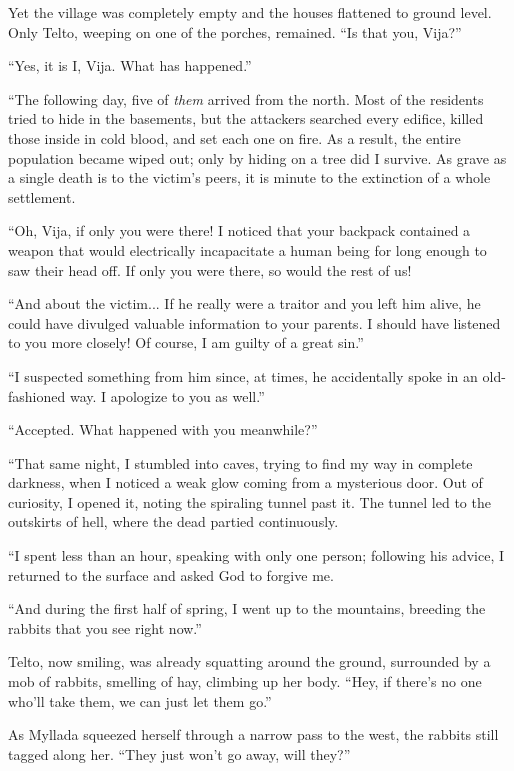 Yet the village was completely empty and the houses flattened to ground level. Only Telto, weeping on one of the porches, remained. ``Is that you, Vija?''

``Yes, it is I, Vija. What has happened.''

``The following day, five of \emph{them} arrived from the north. Most of the residents tried to hide in the basements, but the attackers searched every edifice, killed those inside in cold blood, and set each one on fire. As a result, the entire population became wiped out; only by hiding on a tree did I survive. As grave as a single death is to the victim's peers, it is minute to the extinction of a whole settlement.

``Oh, Vija, if only you were there! I noticed that your backpack contained a weapon that would electrically incapacitate a human being for long enough to saw their head off. If only you were there, so would the rest of us!

``And about the victim... If he really were a traitor and you left him alive, he could have divulged valuable information to your parents. I should have listened to you more closely! Of course, I am guilty of a great sin.''

``I suspected something from him since, at times, he accidentally spoke in an old-fashioned way. I apologize to you as well.''

``Accepted. What happened with you meanwhile?''

``That same night, I stumbled into caves, trying to find my way in complete darkness, when I noticed a weak glow coming from a mysterious door. Out of curiosity, I opened it, noting the spiraling tunnel past it. The tunnel led to the outskirts of hell, where the dead partied continuously.

``I spent less than an hour, speaking with only one person; following his advice, I returned to the surface and asked God to forgive me.

``And during the first half of spring, I went up to the mountains, breeding the rabbits that you see right now.''

Telto, now smiling, was already squatting around the ground, surrounded by a mob of rabbits, smelling of hay, climbing up her body. ``Hey, if there's no one who'll take them, we can just let them go.''

\centeredstars

As Myllada squeezed herself through a narrow pass to the west, the rabbits still tagged along her. ``They just won't go away, will they?''

